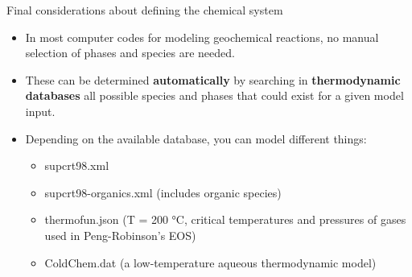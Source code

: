 %
\begin{frame}{Final considerations about defining the chemical system}
	\vskip 10pt
\begin{itemize}
\item In most computer codes for modeling geochemical reactions, no manual
selection of phases and species are needed. 
\pause
\item These can be determined \textbf{automatically} by searching in \textbf{thermodynamic
databases} all possible species and phases that could exist for a
given model input. 
\pause
\item Depending on the available database, you can model different things: 
\begin{itemize}
\item supcrt98.xml
\item supcrt98-organics.xml (includes organic species)
\item thermofun.json (T = 200 °C, critical temperatures and pressures of gases used in Peng-Robinson's EOS) 
\item ColdChem.dat (a low-temperature aqueous thermodynamic model)
\end{itemize}

\end{itemize}
\end{frame}
